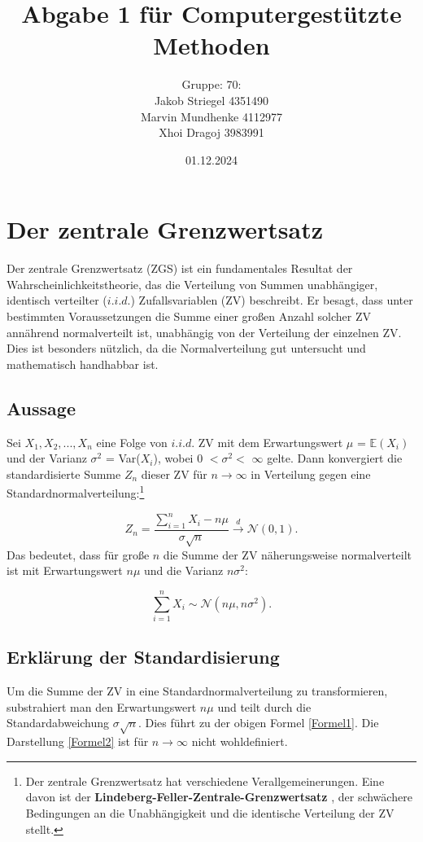 \documentclass{article}
\title{Abgabe 1 für Computergestützte Methoden}
\author{Gruppe: 70: \\Jakob Striegel {\small4351490} \\Marvin Mundhenke {\small4112977} \\Xhoi Dragoj {\small3983991}}
\date{01.12.2024}
\begin{document}
\maketitle
\tableofcontents
\newpage
\section{Der zentrale Grenzwertsatz}
Der zentrale Grenzwertsatz (ZGS) ist ein fundamentales Resultat der Wahrscheinlichkeitstheorie, das die Verteilung von Summen unabhängiger, identisch verteilter ($i.i.d.$) Zufallsvariablen (ZV) beschreibt. Er besagt, dass unter bestimmten Voraussetzungen die Summe einer großen Anzahl solcher ZV annährend normalverteilt ist, unabhängig von der Verteilung der einzelnen ZV. Dies ist besonders nützlich, da die Normalverteilung gut untersucht und mathematisch handhabbar ist.



\subsection{Aussage}
Sei $ X_{1} ,X_{2},..., X_{n} $ eine Folge von $i.i.d.$ ZV mit dem Erwartungswert $\mu$  = $\mathbb{E}(X_{i})$ 
und der Varianz $\sigma^2$ = Var($X_{i}$), wobei  0 $< \sigma^2 <$ $ \infty$ gelte. Dann konvergiert
die standardisierte Summe $Z_{n}$  dieser ZV für $n \to  \infty$  in Verteilung gegen eine
Standardnormalverteilung:\footnote[1]{Der zentrale Grenzwertsatz hat verschiedene Verallgemeinerungen. Eine davon ist der \textbf{Lindeberg-Feller-Zentrale-Grenzwertsatz} \citep[Seite 328]{klenke}, der schwächere Bedingungen an die Unabhängigkeit und die identische Verteilung der ZV stellt.}

\begin{equation}
    \label{Formel1}
    Z_{n}= \frac{\sum_{i=1}^{n} X_{i}-n\mu}{\sigma \sqrt{n}} \overset{d}{\to} \mathcal{N}(0,1).
\end{equation}
Das bedeutet, dass für große $n$ die Summe der ZV näherungsweise normalverteilt ist mit Erwartungswert $n\mu$ und die Varianz $n\sigma^2$:

\begin{equation}
    \label{Formel2}
    \sum_{i=1}^{n} X_{i} \sim \mathcal{N}(n\mu,n\sigma^2).
\end{equation}



\subsection{Erklärung der Standardisierung}
Um die Summe der ZV in eine Standardnormalverteilung zu transformieren, substrahiert man den Erwartungswert $n\mu$ und teilt durch die Standardabweichung $\sigma\sqrt{n}$. Dies führt zu der obigen Formel \eqref{Formel1}. Die Darstellung \eqref{Formel2} ist für $n \to \infty$ nicht wohldefiniert.
\end{document}
